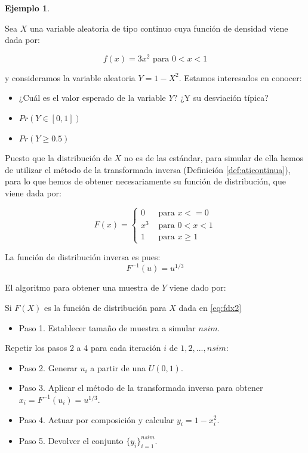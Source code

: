 \documentclass[
]{book}
\providecommand{\tightlist}{%
  \setlength{\itemsep}{0pt}\setlength{\parskip}{0pt}}
\newenvironment{silverbox}{
  \definecolor{shadecolor}{rgb}{192, 192, 192}  
  \color{black}
  \begin{shaded}}
 {\end{shaded}}
\theoremstyle{definition}
\theoremstyle{definition}
\newtheorem{example}{Ejemplo}[chapter]
\theoremstyle{definition}
\theoremstyle{definition}
\theoremstyle{remark}
\begin{document}
\begin{example}
\protect\hypertarget{exm:cont2}{}\label{exm:cont2}

Sea \(X\) una variable aleatoria de tipo continuo cuya función de densidad viene dada por:

\begin{equation*}
f(x) = 3x^2  \text{ para } 0 < x < 1
\end{equation*}

y consideramos la variable aleatoria \(Y = 1 - X^2\). Estamos interesados en conocer:

\begin{itemize}
\tightlist
\item
  ¿Cuál es el valor esperado de la variable \(Y\)? ¿Y su desviación típica?
\item
  \(Pr(Y \in [0,1])\)
\item
  \(Pr(Y \geq 0.5)\)
\end{itemize}

\end{example}

Puesto que la distribución de \(X\) no es de las estándar, para simular de ella hemos de utilizar el método de la transformada inversa (Definición \ref{def:aticontinua}), para lo que hemos de obtener necesariamente su función de distribución, que viene dada por:

\begin{equation}
F(x) = 
\begin{cases}
0 & \text{ para } x <= 0\\
x^3 & \text{ para } 0 < x < 1\\
1 & \text{ para } x \geq 1
\end{cases}
\label{eq:fdx2}
\end{equation}

La función de distribución inversa es pues: \[F^{-1}(u)=u^{1/3}\]

El algoritmo para obtener una muestra de \(Y\) viene dado por:

\begin{silverbox}

Si \(F(X)\) es la función de distribución para \(X\) dada en \eqref{eq:fdx2}

\begin{itemize}
\tightlist
\item
  Paso 1. Establecer tamaño de muestra a simular \(nsim\).
\end{itemize}

Repetir los pasos 2 a 4 para cada iteración \(i\) de \(1, 2,..., nsim\):

\begin{itemize}
\tightlist
\item
  Paso 2. Generar \(u_i\) a partir de una \(U(0,1)\).
\item
  Paso 3. Aplicar el método de la transformada inversa para obtener \(x_i = F^{-1}(u_i)=u^{1/3}\).
\item
  Paso 4. Actuar por composición y calcular \(y_i = 1 - x_i^2\).
\item
  Paso 5. Devolver el conjunto \(\{y_i\}_{i=1}^{nsim}.\)
\end{itemize}

\end{silverbox}
\end{document}
